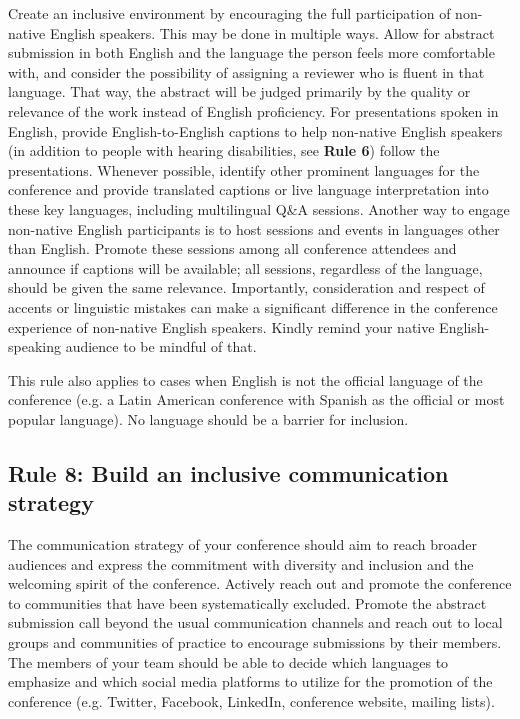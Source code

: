 \documentclass[10pt,letterpaper]{article}
\begin{document}
Create an inclusive environment by encouraging the full participation of non-native English speakers. This may be done in multiple ways.
Allow for abstract submission in both English and the language the person feels more comfortable with, and consider the possibility of assigning a reviewer who is fluent in that language. That way, the abstract will be judged primarily by the quality or relevance of the work instead of English proficiency.
For presentations spoken in English, provide English-to-English captions to help non-native English speakers (in addition to people with hearing disabilities, see \textbf{Rule 6}) follow the presentations. 
Whenever possible, identify other prominent languages for the conference and provide translated captions or live language interpretation into these key languages, including multilingual Q\&A sessions.
Another way to engage non-native English participants is to host sessions and events in languages other than English. 
Promote these sessions among all conference attendees and announce if captions will be available; all sessions, regardless of the language, should be given the same relevance.
Importantly, consideration and respect of accents or linguistic mistakes can make a significant difference in the conference experience of non-native English speakers. Kindly remind your native English-speaking audience to be mindful of that.

This rule also applies to cases when English is not the official language of the conference (e.g. a Latin American conference with Spanish as the official or most popular language). No language should be a barrier for inclusion. 



\subsection*{Rule 8: Build an inclusive communication strategy}
\label{rule_communication}

The communication strategy of your conference should aim to reach broader audiences and express the commitment with diversity and inclusion and the welcoming spirit of the conference.
Actively reach out and promote the conference to communities that have been systematically excluded. 
Promote the abstract submission call beyond the usual communication channels and reach out to local groups and communities of practice to encourage submissions by their members.
The members of your team should be able to decide which languages to emphasize and which social media platforms to utilize for the promotion of the conference (e.g. Twitter, Facebook, LinkedIn, conference website, mailing lists).
\end{document}
